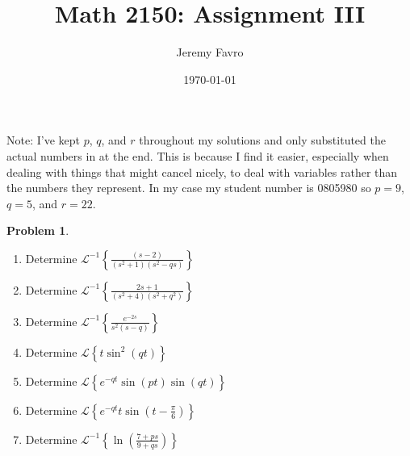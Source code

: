 \documentclass[10pt]{article}
\title{Math 2150: Assignment III}
\author{Jeremy Favro}
\date{\today}
\theoremstyle{definition}
\newtheorem{problem}{Problem}
\newcommand{\laplace}[1]{\mathcal{L}\left\{#1\right\}}
\newcommand{\laplacei}[1]{\mathcal{L}^{-1}\left\{#1\right\}}
\begin{document}
\maketitle
\noindent Note: I've kept $p$, $q$, and $r$ throughout my solutions and only substituted the actual numbers in at the end. This is because I find it easier,
especially when dealing with things that might cancel nicely, to deal with variables rather than the numbers they represent. In my case my
student number is 0805980 so $p=9$, $q=5$, and $r=22$.
\\
\begin{problem}~
\begin{enumerate}[label=(\alph*)]
  \item Determine $\laplacei{\frac{\left(s-2\right)}{\left(s^2+1\right)\left(s^2-qs\right)}}$
  \item Determine $\laplacei{\frac{2s+1}{\left(s^2+4\right)\left(s^2+q^2\right)}}$
  \item Determine $\laplacei{\frac{e^{-2s}}{s^2\left(s-q\right)}}$
  \item Determine $\laplace{t\sin^2\left(qt\right)}$
  \item Determine $\laplace{e^{-qt}\sin\left(pt\right)\sin\left(qt\right)}$
  \item Determine $\laplace{e^{-qt}t\sin\left(t-\frac{\pi}{6}\right)}$
  \item Determine $\laplacei{\ln\left(\frac{7+ps}{9+qs}\right)}$
\end{enumerate}
\end{problem}
\end{document}
